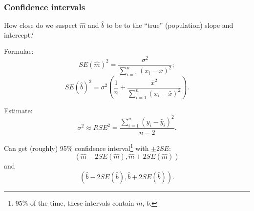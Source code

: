 \documentclass{beamer}
\theoremstyle{example}
\begin{document}
\begin{frame}
    \frametitle{Confidence intervals}
    How close do we suspect $\hat{m}$ and $\hat{b}$ to be to the ``true'' (population) slope and intercept?
    
    Formulae: 
    \[SE(\hat{m})^2 = \frac{\sigma^2}{\sum_{i=1}^n(x_i - \bar{x})^2};\]
    \[SE(\hat{b})^2 = \sigma^2\left(\frac1{n} + \frac{\bar{x}^2}{\sum_{i=1}^n(x_i - \bar{x})^2}\right).\]
    
    Estimate:
        \[\sigma^2 \approx RSE^2 = \frac{\sum_{i=1}^n(y_i - \hat{y}_i)^2}{n-2}.\]
    
    Can get (roughly) 95\% confidence interval\footnote{95\% of the time, these intervals contain $m$, $b$.} with $\pm 2SE$: 
        \[(\hat{m} - 2SE(\hat{m}), \hat{m} + 2SE(\hat{m}))\]
    and 
        \[(\hat{b} - 2SE(\hat{b}), \hat{b} + 2SE(\hat{b})).\]
    
\end{frame}
\end{document}
